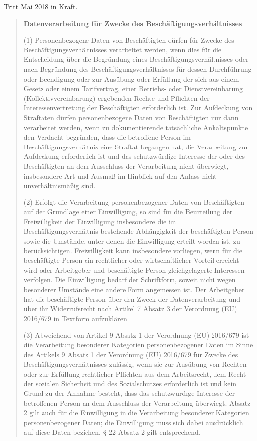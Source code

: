     Tritt Mai 2018 in Kraft.
    
    \begin{quotation}
      \textbf{Datenverarbeitung für Zwecke des Beschäftigungsverhältnisses}
    
        (1) Personenbezogene Daten von Beschäftigten dürfen für Zwecke des Beschäftigungsverhältnisses verarbeitet werden, wenn dies für die Entscheidung über die Begründung eines Beschäftigungsverhältnisses oder nach Begründung des Beschäftigungsverhältnisses für dessen Durchführung oder Beendigung oder zur Ausübung oder Erfüllung der sich aus einem Gesetz oder einem Tarifvertrag, einer Betriebs- oder Dienstvereinbarung (Kollektivvereinbarung) ergebenden Rechte und Pflichten der Interessenvertretung der Beschäftigten erforderlich ist. Zur Aufdeckung von Straftaten dürfen personenbezogene Daten von Beschäftigten nur dann verarbeitet werden, wenn zu dokumentierende tatsächliche Anhaltspunkte den Verdacht begründen, dass die betroffene Person im Beschäftigungsverhältnis eine Straftat begangen hat, die Verarbeitung zur Aufdeckung erforderlich ist und das schutzwürdige Interesse der oder des Beschäftigten an dem Ausschluss der Verarbeitung nicht überwiegt, insbesondere Art und Ausmaß im Hinblick auf den Anlass nicht unverhältnismäßig sind.
        
        (2) Erfolgt die Verarbeitung personenbezogener Daten von Beschäftigten auf der Grundlage einer Einwilligung, so sind für die Beurteilung der Freiwilligkeit der Einwilligung insbesondere die im Beschäftigungsverhältnis bestehende Abhängigkeit der beschäftigten Person sowie die Umstände, unter denen die Einwilligung erteilt worden ist, zu berücksichtigen. Freiwilligkeit kann insbesondere vorliegen, wenn für die beschäftigte Person ein rechtlicher oder wirtschaftlicher Vorteil erreicht wird oder Arbeitgeber und beschäftigte Person gleichgelagerte Interessen verfolgen. Die Einwilligung bedarf der Schriftform, soweit nicht wegen besonderer Umstände eine andere Form angemessen ist. Der Arbeitgeber hat die beschäftigte Person über den Zweck der Datenverarbeitung und über ihr Widerrufsrecht nach Artikel 7 Absatz 3 der Verordnung (EU) 2016/679 in Textform aufzuklären.
        
        (3) Abweichend von Artikel 9 Absatz 1 der Verordnung (EU) 2016/679 ist die Verarbeitung besonderer Kategorien personenbezogener Daten im Sinne des Artikels 9 Absatz 1 der Verordnung (EU) 2016/679 für Zwecke des Beschäftigungsverhältnisses zulässig, wenn sie zur Ausübung von Rechten oder zur Erfüllung rechtlicher Pflichten aus dem Arbeitsrecht, dem Recht der sozialen Sicherheit und des Sozialschutzes erforderlich ist und kein Grund zu der Annahme besteht, dass das schutzwürdige Interesse der betroffenen Person an dem Ausschluss der Verarbeitung überwiegt. Absatz 2 gilt auch für die Einwilligung in die Verarbeitung besonderer Kategorien personenbezogener Daten; die Einwilligung muss sich dabei ausdrücklich auf diese Daten beziehen. § 22 Absatz 2 gilt entsprechend.
        

\end{quotation}

